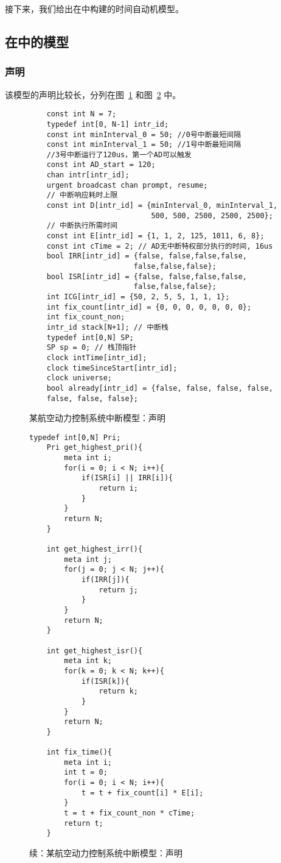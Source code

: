 接下来，我们给出在\uppaal 中构建的时间自动机模型。


\subsection{在\uppaal 中的模型}
\label{subsec:model}

\subsubsection{声明}
\label{subsubsec:exp_decl}

该模型的声明比较长，分列在图~\ref{fig:exp_decl} 和图~\ref{fig:exp_decl_2} 中。

\begin{figure}[H]
	\centering
	\begin{lstlisting}
	const int N = 7;
	typedef int[0, N-1] intr_id; 	
	const int minInterval_0 = 50; //0号中断最短间隔
	const int minInterval_1 = 50; //1号中断最短间隔	
	//3号中断运行了120us，第一个AD可以触发
	const int AD_start = 120; 	
	chan intr[intr_id];
	urgent broadcast chan prompt, resume;	
	// 中断响应耗时上限
	const int D[intr_id] = {minInterval_0, minInterval_1, 
							500, 500, 2500, 2500, 2500};
	// 中断执行所需时间 
	const int E[intr_id] = {1, 1, 2, 125, 1011, 6, 8}; 
	const int cTime = 2; // AD无中断特权部分执行的时间, 16us
	bool IRR[intr_id] = {false, false,false,false,
						false,false,false};
	bool ISR[intr_id] = {false, false,false,false,
						false,false,false};
	int ICG[intr_id] = {50, 2, 5, 5, 1, 1, 1}; 
	int fix_count[intr_id] = {0, 0, 0, 0, 0, 0, 0};
	int fix_count_non;	
	intr_id stack[N+1]; // 中断栈
	typedef int[0,N] SP;
	SP sp = 0; // 栈顶指针
	clock intTime[intr_id];
	clock timeSinceStart[intr_id];
	clock universe;	
	bool already[intr_id] = {false, false, false, false, 
	false, false, false};
	\end{lstlisting}
	\caption{某航空动力控制系统中断模型：声明}
	\label{fig:exp_decl}
\end{figure}

\begin{figure}[H]
	\centering
	\begin{lstlisting}[firstnumber=30]
	typedef int[0,N] Pri;
	Pri get_highest_pri(){
		meta int i;
		for(i = 0; i < N; i++){
			if(ISR[i] || IRR[i]){
				return i;
			} 
		}
		return N;
	}
	
	int get_highest_irr(){
		meta int j;
		for(j = 0; j < N; j++){
			if(IRR[j]){
				return j;
			} 
		}
		return N;
	}
	
	int get_highest_isr(){
		meta int k;
		for(k = 0; k < N; k++){
			if(ISR[k]){
				return k;
			} 
		}
		return N;
	}
	
	int fix_time(){
		meta int i;
		int t = 0;
		for(i = 0; i < N; i++){
			t = t + fix_count[i] * E[i];
		}
		t = t + fix_count_non * cTime;
		return t;
	} 
	\end{lstlisting}
	\caption{续：某航空动力控制系统中断模型：声明}
	\label{fig:exp_decl_2}
\end{figure}

